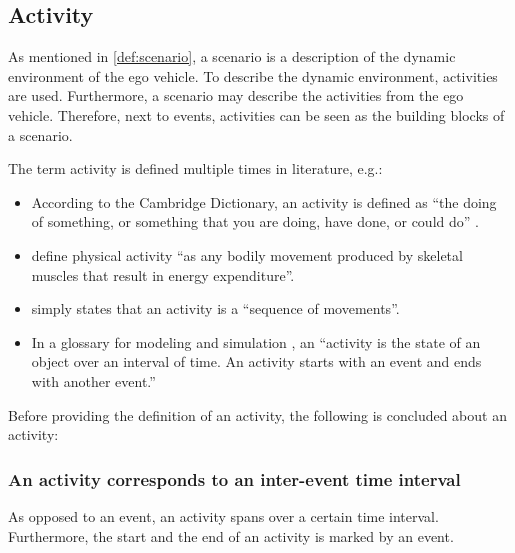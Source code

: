 


\subsection{Activity}
\label{sec:activity}

As mentioned in \cref{def:scenario}, a scenario is a description of the dynamic environment of the ego vehicle. To describe the dynamic environment, activities are used. Furthermore, a scenario may describe the activities from the ego vehicle. Therefore, next to events, activities can be seen as the building blocks of a scenario.

The term activity is defined multiple times in literature, e.g.:
\begin{itemize}
	\item According to the Cambridge Dictionary, an activity is defined as ``the doing of something, or something that you are doing, have done, or could do'' \cite{cambridge2019activity}.
	\item \textcite{caspersen1985physical} define physical activity ``as any bodily movement produced by skeletal muscles that result in energy expenditure''.
	\item \textcite{bobick1997movement} simply states that an activity is a ``sequence of movements''. 
	\item In a glossary for modeling and simulation \cite{sigsim2019glossary}, an ``activity is the state of an object over an interval of time. An activity starts with an event and ends with another event.''
\end{itemize}

Before providing the definition of an activity, the following is concluded about an activity:

\subsubsection{An activity corresponds to an inter-event time interval}
As opposed to an event, an activity spans over a certain time interval. Furthermore, the start and the end of an activity is marked by an event.

